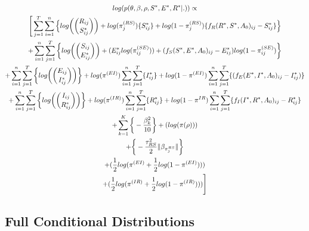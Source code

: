 \documentclass[12pt]{article}
\begin{document}
\begin{center}
\begin{multline}
\displaystyle
log(p(\theta,\beta,\rho,S^*,E^*,R^*|.)) \propto\\ \Bigg[ 
    \sum_{j=1}^T \sum_{i=1}^n\Big\{log\bigg(\dbinom{R_{ij}}{S^*_{ij}}\bigg) + log(\pi_j^{(RS)})\{S^*_{ij}\} + 
            log(1-\pi_j^{(RS)})\{f_R(R^*, S^*, A_0)_{ij} - S^*_{ij}\}\Big\} \\ 
            +\sum_{i=1}^n \sum_{j=1}^T\bigg\{
            log\bigg(\dbinom{S_{ij}}{E^*_{ij}}\bigg) + (E^*_{ij}log(\pi_{ij}^{(SE)})) + (f_S(S^*, E^*, A_0)_{ij} - E^*_{ij})log(1-\pi_{ij}^{(SE)})\bigg\} \\
            + \sum_{i=1}^n\sum_{j=1}^T\bigg\{ log\bigg(\dbinom{E_{ij}}{I^*_{ij}}\bigg)\bigg\} + log(\pi^{(EI)})\sum_{i=1}^n\sum_{j=1}^T\{I^*_{ij}\} 
            + log(1-\pi^{(EI)})\sum_{i=1}^n\sum_{j=1}^T\{(f_E(E^*, I^*, A_0)_{ij} - I^*_{ij})\}\\
            + \sum_{i=1}^n\sum_{j=1}^T\bigg\{ log\bigg(\dbinom{I_{ij}}{R^*_{ij}}\bigg)\bigg\} + log(\pi^{(IR)})\sum_{i=1}^n\sum_{j=1}^T\{R^*_{ij}\} + 
            log(1-\pi^{IR})\sum_{i=1}^n\sum_{j=1}^T\{ f_I(I^*, R^*, A_0)_{ij} - R^*_{ij}\}\\
            + \sum_{k = 1}^K\bigg\{-\frac{\beta^2_k}{10}\bigg\}
            + (log(\pi(\rho)))\\
            + \bigg\{ -\frac{\tau^2_{RS}}{2}\|\beta_{\pi_j^{RS}}\|  \bigg\} \\ 
            + (\frac{1}{2}log(\pi^{(EI)} + \frac{1}{2}log(1-\pi^{(EI)}))) \\
            + (\frac{1}{2}log(\pi^{(IR)} + \frac{1}{2}log(1-\pi^{(IR)})))  \Bigg]\\
\end{multline}
\end{center}


\subsection{Full Conditional Distributions}
\end{document}
